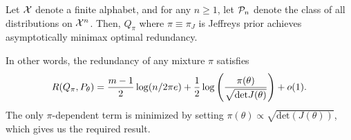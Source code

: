     \begin{theorem}
        \label{thm:jeffreys-redundancy} Let $\mathcal{X}$ denote a finite alphabet, and for any $n \geq 1$, let $\mathcal{P}_n$ denote the class of all \iid distributions on $\mathcal{X}^n$. Then, $Q_\pi$ where $\pi \equiv \pi_J$ is Jeffreys prior achieves asymptotically minimax optimal redundancy.

        In other words, the redundancy of any mixture $\pi$ satisfies 
        \begin{align}
            R(Q_\pi, P_\theta) = \frac{m-1}{2} \log (n/2 \pi e) + \frac{1}{2} \log \left( \frac{\pi(\theta)}{\sqrt{\text{det}J(\theta)}} \right) + o(1). 
        \end{align}
        The only $\pi$-dependent term is minimized by setting $\pi(\theta) \propto \sqrt{\text{det}(J(\theta))}$, which gives us the required result. 
    \end{theorem}

